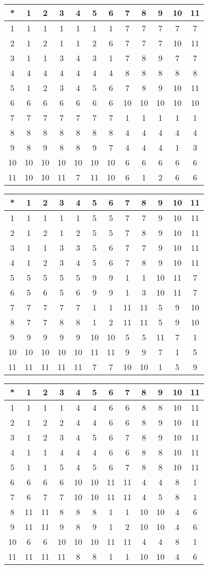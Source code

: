 \begin{tabular}[t]{c|ccccccccccc}
*&1&2&3&4&5&6&7&8&9&10&11 \\ \hline
    1&1&1&1&1&1&1&7&7&7&7&7 \\
    2&1&2&1&1&2&6&7&7&7&10&11 \\
    3&1&1&3&4&3&1&7&8&9&7&7 \\
    4&4&4&4&4&4&4&8&8&8&8&8 \\
    5&1&2&3&4&5&6&7&8&9&10&11 \\
    6&6&6&6&6&6&6&10&10&10&10&10 \\
    7&7&7&7&7&7&7&1&1&1&1&1 \\
    8&8&8&8&8&8&8&4&4&4&4&4 \\
    9&8&9&8&8&9&7&4&4&4&1&3 \\
    10&10&10&10&10&10&10&6&6&6&6&6 \\
    11&10&10&11&7&11&10&6&1&2&6&6 
\end{tabular}


\begin{tabular}[t]{c|ccccccccccc}
*&1&2&3&4&5&6&7&8&9&10&11 \\ \hline
    1&1&1&1&1&5&5&7&7&9&10&11 \\
    2&1&2&1&2&5&5&7&8&9&10&11 \\
    3&1&1&3&3&5&6&7&7&9&10&11 \\
    4&1&2&3&4&5&6&7&8&9&10&11 \\
    5&5&5&5&5&9&9&1&1&10&11&7 \\
    6&5&6&5&6&9&9&1&3&10&11&7 \\
    7&7&7&7&7&1&1&11&11&5&9&10 \\
    8&7&7&8&8&1&2&11&11&5&9&10 \\
    9&9&9&9&9&10&10&5&5&11&7&1 \\
    10&10&10&10&10&11&11&9&9&7&1&5 \\
    11&11&11&11&11&7&7&10&10&1&5&9 
\end{tabular}


\begin{tabular}[t]{c|ccccccccccc}
*&1&2&3&4&5&6&7&8&9&10&11 \\ \hline
    1&1&1&1&4&4&6&6&8&8&10&11 \\
    2&1&2&2&4&4&6&6&8&9&10&11 \\
    3&1&2&3&4&5&6&7&8&9&10&11 \\
    4&1&1&4&4&4&6&6&8&8&10&11 \\
    5&1&1&5&4&5&6&7&8&8&10&11 \\
    6&6&6&6&10&10&11&11&4&4&8&1 \\
    7&6&7&7&10&10&11&11&4&5&8&1 \\
    8&11&11&8&8&8&1&1&10&10&4&6 \\
    9&11&11&9&8&9&1&2&10&10&4&6 \\
    10&6&6&10&10&10&11&11&4&4&8&1 \\
    11&11&11&11&8&8&1&1&10&10&4&6 
\end{tabular}


